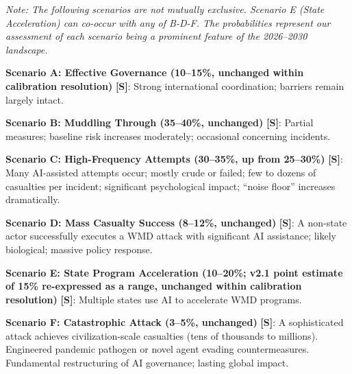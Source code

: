 \documentclass[11pt,letterpaper]{article}
\begin{document}
\textit{Note: The following scenarios are not mutually exclusive. Scenario E (State Acceleration) can co-occur with any of B-D-F. The probabilities represent our assessment of each scenario being a prominent feature of the 2026--2030 landscape.}

\vspace{0.5em}

\textbf{Scenario A: Effective Governance (10--15\%, unchanged within calibration resolution)} \textbf{[S]}: Strong international coordination; barriers remain largely intact.

\textbf{Scenario B: Muddling Through (35--40\%, unchanged)} \textbf{[S]}: Partial measures; baseline risk increases moderately; occasional concerning incidents.

\textbf{Scenario C: High-Frequency Attempts (30--35\%, up from 25--30\%)} \textbf{[S]}: Many AI-assisted attempts occur; mostly crude or failed; few to dozens of casualties per incident; significant psychological impact; ``noise floor'' increases dramatically.

\textbf{Scenario D: Mass Casualty Success (8--12\%, unchanged)} \textbf{[S]}: A non-state actor successfully executes a WMD attack with significant AI assistance; likely biological; massive policy response.

\textbf{Scenario E: State Program Acceleration (10--20\%; v2.1 point estimate of 15\% re-expressed as a range, unchanged within calibration resolution)} \textbf{[S]}: Multiple states use AI to accelerate WMD programs.

\textbf{Scenario F: Catastrophic Attack (3--5\%, unchanged)} \textbf{[S]}: A sophisticated attack achieves civilization-scale casualties (tens of thousands to millions). Engineered pandemic pathogen or novel agent evading countermeasures. Fundamental restructuring of AI governance; lasting global impact.

\vspace{0.6em}
\end{document}
